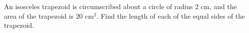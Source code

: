 An isosceles trapezoid is circumscribed about a circle of radius $2$ cm, and the area of the trapezoid is $20$ cm$^2$. Find the length of each of the equal sides of the trapezoid.
